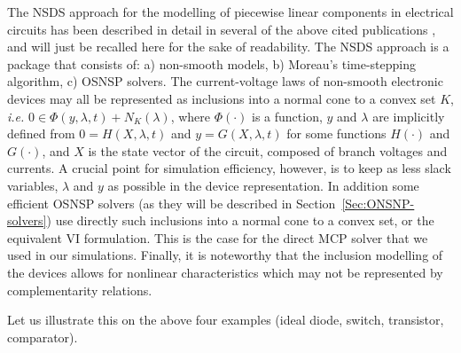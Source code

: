 The NSDS approach for the  modelling of piecewise linear components in electrical circuits has been described in detail  in several of the above cited publications \cite{acary-brogliato2008,glocker2005,moreau1988,jean1999,moreau1999}, and will just be recalled here for the sake of readability. The NSDS approach is a package that consists of: a) non-smooth models, b) Moreau's time-stepping algorithm, c) OSNSP solvers. The current-voltage laws of non-smooth electronic devices  may all be represented as inclusions into a normal cone to a convex set $K$, \textit{i.e.} $0 \in \Phi(y,\lambda,t) + N_{K}(\lambda)$, where $\Phi(\cdot)$ is a function, $y$ and $\lambda$ are implicitly defined from $0=H(X,\lambda,t)$ and $y=G(X,\lambda,t)$ for some functions $H(\cdot)$ and $G(\cdot)$, and $X$ is the state vector of the circuit, composed of branch voltages and currents. A crucial point for simulation efficiency, however, is to keep as less slack variables, $\lambda$ and $y$ as possible in the device representation. In addition some efficient OSNSP solvers (as they will be described in Section~\ref{Sec:ONSNP-solvers}) use directly such inclusions into a normal cone to a convex set, or the equivalent VI formulation. This is the case for the direct MCP solver that we used in our simulations. Finally, it is noteworthy that the inclusion modelling of the devices allows for nonlinear characteristics which may not be represented by complementarity relations. 

 Let us illustrate this on the above four examples (ideal diode, switch, transistor, comparator).

